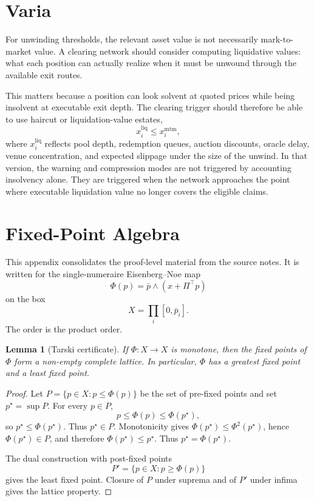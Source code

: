 \documentclass[11pt,oneside]{article}
\newtheorem{lemma}{Lemma}
\newcommand{\barp}{\bar p}
\begin{document}
\section{Varia}

For unwinding thresholds, the relevant asset value is not necessarily
mark-to-market value. A clearing network should consider computing
liquidative values: what each position can actually realize when it must be
unwound through the available exit routes.

This matters because a position can look solvent at quoted prices while being
insolvent at executable exit depth. The clearing trigger should therefore be
able to use haircut or liquidation-value estates,
\[
  x_i^{\mathrm{liq}} \leq x_i^{\mathrm{mtm}},
\]
where $x_i^{\mathrm{liq}}$ reflects pool depth, redemption queues, auction
discounts, oracle delay, venue concentration, and expected slippage under the
size of the unwind. In that version, the warning and compression modes are not
triggered by accounting insolvency alone. They are triggered when the network
approaches the point where executable liquidation value no longer covers the
eligible claims.

\appendix

\section{Fixed-Point Algebra}

This appendix consolidates the proof-level material from the source notes. It
is written for the single-numeraire Eisenberg--Noe map
\[
  \Phi(p)=\barp\wedge (x+\Pi^\top p)
\]
on the box
\[
  X=\prod_i[0,\barp_i].
\]
The order is the product order.

\begin{lemma}[Tarski certificate]
If $\Phi:X\to X$ is monotone, then the fixed points of $\Phi$ form a non-empty
complete lattice. In particular, $\Phi$ has a greatest fixed point and a least
fixed point.
\end{lemma}

\begin{proof}
Let $P=\{p\in X:p\leq\Phi(p)\}$ be the set of pre-fixed points and set
$p^\star=\sup P$. For every $p\in P$,
\[
  p\leq \Phi(p)\leq \Phi(p^\star),
\]
so $p^\star\leq\Phi(p^\star)$. Thus $p^\star\in P$. Monotonicity gives
$\Phi(p^\star)\leq\Phi^2(p^\star)$, hence $\Phi(p^\star)\in P$, and therefore
$\Phi(p^\star)\leq p^\star$. Thus $p^\star=\Phi(p^\star)$.

The dual construction with post-fixed points
\[
  P'=\{p\in X:p\geq\Phi(p)\}
\]
gives the least fixed point. Closure of $P$ under suprema and of $P'$ under
infima gives the lattice property.
\end{proof}
\end{document}
